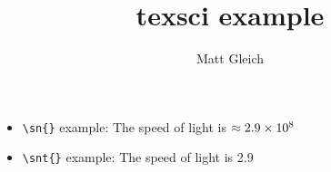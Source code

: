 \documentclass{report}
\title{texsci example}
\author{Matt Gleich}
\date{}
\begin{document}
    \maketitle

    \begin{itemize}
        \item \verb!\sn{}! example: The speed of light is $ \approx 2.9 \times 10^{8} $
        \item \verb!\snt{}! example: The speed of light is 2.9 
    \end{itemize}
\end{document}
